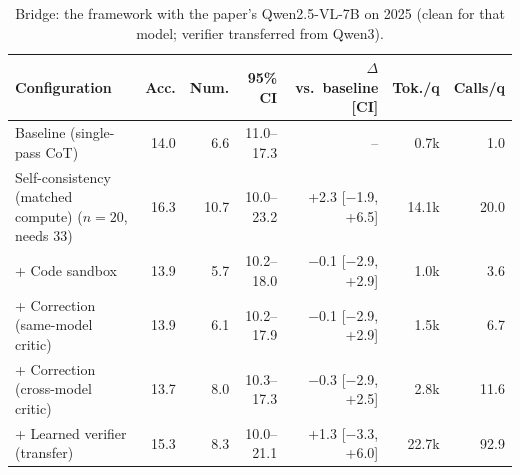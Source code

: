 \begin{table}[!t]
\centering
\footnotesize
\caption{Bridge: the framework with the paper's Qwen2.5-VL-7B on 2025 (clean for that model; verifier transferred from Qwen3).}
\label{tab:q25}
\setlength{\tabcolsep}{3.5pt}
\begin{tabular}{lrrrrrr}
\toprule
Configuration & Acc. & Num. & 95\% CI & $\Delta$ vs.\ baseline [CI] & Tok./q & Calls/q \\
\midrule
Baseline (single-pass CoT) & 14.0 & 6.6 & 11.0--17.3 & -- & 0.7k & 1.0 \\
Self-consistency (matched compute) ($n{=}20$, needs 33) & 16.3 & 10.7 & 10.0--23.2 & +2.3 [$-$1.9, +6.5] & 14.1k & 20.0 \\
+ Code sandbox & 13.9 & 5.7 & 10.2--18.0 & $-$0.1 [$-$2.9, +2.9] & 1.0k & 3.6 \\
+ Correction (same-model critic) & 13.9 & 6.1 & 10.2--17.9 & $-$0.1 [$-$2.9, +2.9] & 1.5k & 6.7 \\
+ Correction (cross-model critic) & 13.7 & 8.0 & 10.3--17.3 & $-$0.3 [$-$2.9, +2.5] & 2.8k & 11.6 \\
+ Learned verifier (transfer) & 15.3 & 8.3 & 10.0--21.1 & +1.3 [$-$3.3, +6.0] & 22.7k & 92.9 \\
\bottomrule
\end{tabular}
\end{table}
